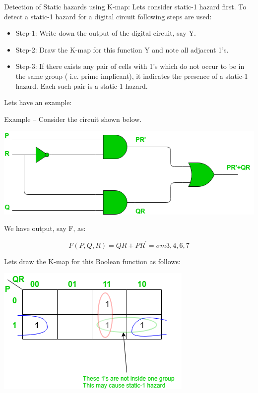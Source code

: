 \documentclass[12pt]{article}
\begin{document}
Detection of Static hazards using K-map:
Lets consider static-1 hazard first. To detect a static-1 hazard for a digital circuit following steps are used:


\begin{itemize}
	\item Step-1: Write down the output of the digital circuit, say Y.
	\item Step-2: Draw the K-map for this function Y and note all adjacent 1’s.
	\item Step-3: If there exists any pair of cells with 1’s which do not occur to be in the same group ( i.e. prime implicant), it indicates the presence of a static-1 hazard. Each such pair is a static-1 hazard.
\end{itemize}


Lets have an example:

Example – Consider the circuit shown below.



\begin{center}
	\includegraphics[scale=0.6]{./333-2.png}
\end{center}


We have output, say F, as:

$$
F(P,Q,R) = QR + PR^{\prime} = \sigma{m{3,4,6,7}}
$$

Lets draw the K-map for this Boolean function as follows:


\begin{center}
	\includegraphics[scale=0.8]{./555-3.png}
\end{center}
\end{document}
